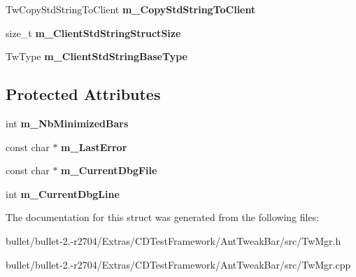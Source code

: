 \begin{DoxyCompactItemize}
\item 
\hypertarget{struct_c_tw_mgr_a884885d3ea4d8538b510de62a7649e0f}{Tw\+Copy\+Std\+String\+To\+Client {\bfseries m\+\_\+\+Copy\+Std\+String\+To\+Client}}\label{struct_c_tw_mgr_a884885d3ea4d8538b510de62a7649e0f}

\item 
\hypertarget{struct_c_tw_mgr_a4ebd0bf0c3ab6b08fc358ff00e3cfa4b}{size\+\_\+t {\bfseries m\+\_\+\+Client\+Std\+String\+Struct\+Size}}\label{struct_c_tw_mgr_a4ebd0bf0c3ab6b08fc358ff00e3cfa4b}

\item 
\hypertarget{struct_c_tw_mgr_a674bda2dc0627f12d61306cbeb362fc2}{Tw\+Type {\bfseries m\+\_\+\+Client\+Std\+String\+Base\+Type}}\label{struct_c_tw_mgr_a674bda2dc0627f12d61306cbeb362fc2}

\end{DoxyCompactItemize}
\subsection*{Protected Attributes}
\begin{DoxyCompactItemize}
\item 
\hypertarget{struct_c_tw_mgr_aad8887d654ac30b8ff8bea7dc2532055}{int {\bfseries m\+\_\+\+Nb\+Minimized\+Bars}}\label{struct_c_tw_mgr_aad8887d654ac30b8ff8bea7dc2532055}

\item 
\hypertarget{struct_c_tw_mgr_af95357e7f89a48b233beb172ac263e3a}{const char $\ast$ {\bfseries m\+\_\+\+Last\+Error}}\label{struct_c_tw_mgr_af95357e7f89a48b233beb172ac263e3a}

\item 
\hypertarget{struct_c_tw_mgr_aec7c43c1ebf863d4280a5cf4e987f03d}{const char $\ast$ {\bfseries m\+\_\+\+Current\+Dbg\+File}}\label{struct_c_tw_mgr_aec7c43c1ebf863d4280a5cf4e987f03d}

\item 
\hypertarget{struct_c_tw_mgr_ab00c1f395847056b16ef40a413d7c712}{int {\bfseries m\+\_\+\+Current\+Dbg\+Line}}\label{struct_c_tw_mgr_ab00c1f395847056b16ef40a413d7c712}

\end{DoxyCompactItemize}


The documentation for this struct was generated from the following files\+:\begin{DoxyCompactItemize}
\item 
bullet/bullet-\/2.-\/r2704/\+Extras/\+C\+D\+Test\+Framework/\+Ant\+Tweak\+Bar/src/Tw\+Mgr.\+h\item 
bullet/bullet-\/2.-\/r2704/\+Extras/\+C\+D\+Test\+Framework/\+Ant\+Tweak\+Bar/src/Tw\+Mgr.\+cpp\end{DoxyCompactItemize}
